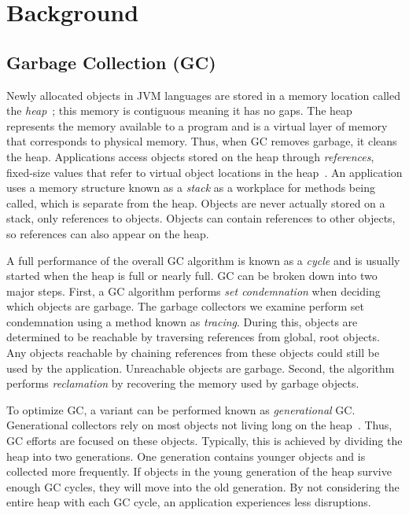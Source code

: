 \documentclass{sig-alternate}
\begin{document}
\section{Background}
\label{sec:background}


\subsection{Garbage Collection (GC)}
\label{sec:garbageCollection}

Newly allocated objects in JVM languages are stored in a memory location called
the \emph{heap}~\cite{oracle:heap}; this memory is contiguous meaning it has no gaps. The heap represents the memory available to a program and is a virtual layer of memory that corresponds to physical memory.
Thus, when GC removes garbage, it cleans the heap.
Applications access objects stored on the heap through \emph{references},
fixed-size values that refer to virtual object locations in the heap~\cite{reilly:reference}. 
An application uses a memory structure known
as a \emph{stack} as a workplace for methods being called, 
which is separate from the heap. Objects are never actually
stored on a stack, only references to objects.
Objects can contain references to other objects, so references can also appear on the heap.

A full
performance of the overall GC algorithm is known as a \emph{cycle} and
is usually started when the heap is full or nearly full. GC can be broken down into two major steps.
First, a GC algorithm performs \emph{set condemnation} when deciding which objects are 
garbage. The garbage collectors we examine perform set condemnation using a method 
known as \emph{tracing}. During this, objects are determined to be reachable by 
traversing references from global, root objects. Any objects reachable by chaining references
from these objects could still be used by the application. 
Unreachable objects are garbage. Second, the algorithm performs 
\emph{reclamation} by recovering the memory used by garbage objects.

To optimize GC, a variant can be performed known as \emph{generational} GC.
Generational collectors rely on most objects not living long on the 
heap~\cite{Tene:C4}. Thus, GC efforts are focused on these objects. Typically, this is achieved
by dividing the heap into two generations. One generation contains younger objects and
is collected more frequently. If objects in the young generation of the heap survive
enough GC cycles, they will move into the old generation. By not considering the entire
heap with each GC cycle, an application experiences less disruptions.
\end{document}
